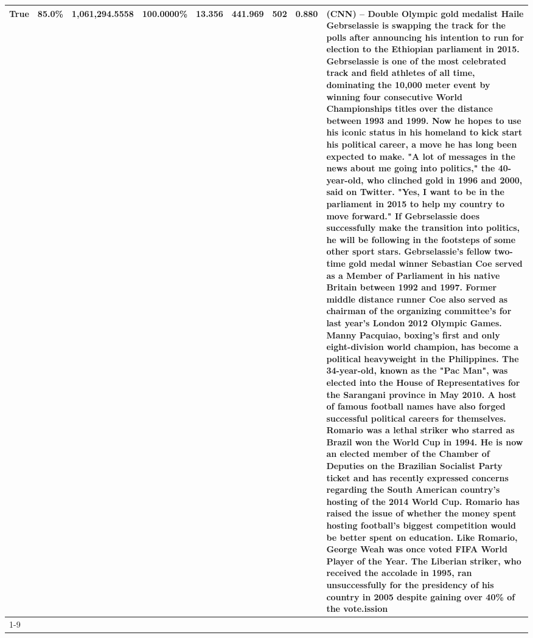 \begin{table}[H]
{\begin{tabular}{lllrlllll}
True & 85.0\% & 1,061,294.5558 & \bfseries \color{red} 100.0000\% & 13.356 & 441.969 & 502 & 0.880 & (CNN) -- Double Olympic gold medalist Haile Gebrselassie is swapping the track for the polls after announcing his intention to run for election to the Ethiopian parliament in 2015. Gebrselassie is one of the most celebrated track and field athletes of all time, dominating the 10,000 meter event by winning four consecutive World Championships titles over the distance between 1993 and 1999. Now he hopes to use his iconic status in his homeland to kick start his political career, a move he has long been expected to make. "A lot of messages in the news about me going into politics," the 40-year-old, who clinched gold in 1996 and 2000, said on Twitter. "Yes, I want to be in the parliament in 2015 to help my country to move forward." If Gebrselassie does successfully make the transition into politics, he will be following in the footsteps of some other sport stars. Gebrselassie's fellow two-time gold medal winner Sebastian Coe served as a Member of Parliament in his native Britain between 1992 and 1997. Former middle distance runner Coe also served as chairman of the organizing committee's for last year's London 2012 Olympic Games. Manny Pacquiao, boxing's first and only eight-division world champion, has become a political heavyweight in the Philippines. The 34-year-old, known as the "Pac Man", was elected into the House of Representatives for the Sarangani province in May 2010. A host of famous football names have also forged successful political careers for themselves. Romario was a lethal striker who starred as Brazil won the World Cup in 1994. He is now an elected member of the Chamber of Deputies on the Brazilian Socialist Party ticket and has recently expressed concerns regarding the South American country's hosting of the 2014 World Cup. Romario has raised the issue of whether the money spent hosting football's biggest competition would be better spent on education. Like Romario, George Weah was once voted FIFA World Player of the Year. The Liberian striker, who received the accolade in 1995, ran unsuccessfully for the presidency of his country in 2005 despite gaining over 40\% of the vote.ission \\
\cline{1-9}

\end{tabular}}
\end{table}
